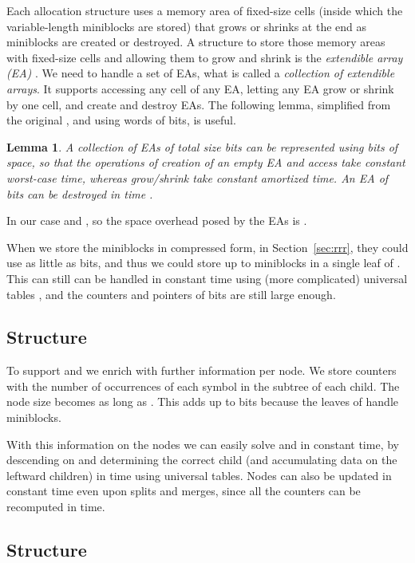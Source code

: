 \documentclass[11pt]{article}
\newtheorem{lemma}{Lemma}
\begin{document}
Each allocation structure uses a memory area of fixed-size cells (inside which 
the variable-length miniblocks are stored) that grows or shrinks at the end
as miniblocks are created or destroyed. A structure to store those memory
areas with fixed-size cells and allowing them to grow and shrink
is the {\em extendible array (EA)} \cite{RR03}. We need to handle a
set of  EAs, what is called a 
{\em collection of extendible 
arrays}. It supports accessing any cell of any EA, letting
any EA grow or shrink by one cell, and create and destroy EAs. 
The following lemma,
simplified from the original \cite[Lemma 1]{RR03}, and using words of 
bits, is useful.

\begin{lemma} \label{lem:EA}
A collection of  EAs of total size  bits can be represented using
 bits of space, so that the operations of 
creation of an empty EA and access take constant worst-case time, whereas 
grow/shrink take constant amortized time. An EA of  bits can be destroyed 
in time .
\end{lemma}

In our case  and , so 
the space overhead posed by the EAs is 
.

When we store the miniblocks in compressed form, in 
Section~\ref{sec:rrr}, they could use as little as 
 bits, and thus we could store up to 
 miniblocks in a single leaf of . 
This can still can be handled in constant time using (more complicated)
universal tables \cite{MN08}, and the counters and pointers of  
bits are still large enough.

\subsection{Structure }

To support  and  we enrich  with further information
per node. We store  counters with the number
of occurrences of each symbol in the subtree of each child. The node size 
becomes 
as long as . This adds up to 
 bits because the leaves of 
handle  miniblocks.

With this information on the nodes we can easily solve  and  in
constant time, by descending on  and determining the correct child
(and accumulating data on the leftward children) in  time using
universal tables. Nodes can also be updated in constant time even upon splits
and merges, since all the counters can be recomputed in  time.

\subsection{Structure }
\end{document}
